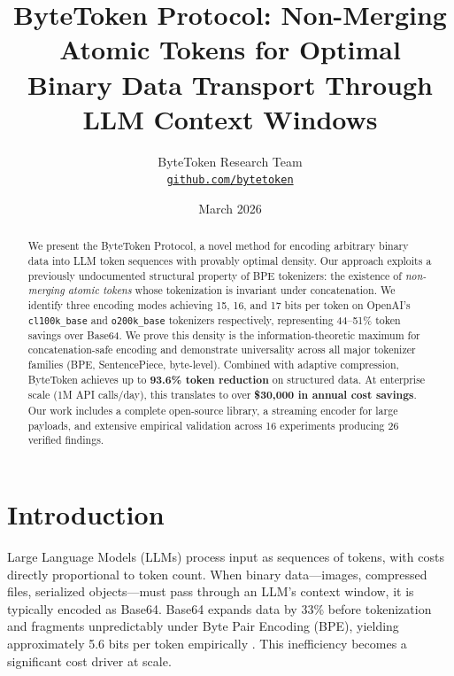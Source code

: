 \documentclass[10pt,twocolumn,letterpaper]{article}
\begin{document}
\title{ByteToken Protocol: Non-Merging Atomic Tokens for Optimal \\ Binary Data Transport Through LLM Context Windows}

\author{ByteToken Research Team\\
{\tt\small \href{https://github.com/bytetoken}{github.com/bytetoken}}
}

\date{March 2026}

\maketitle

\begin{abstract}
We present the ByteToken Protocol, a novel method for encoding arbitrary binary data into LLM token sequences with provably optimal density. Our approach exploits a previously undocumented structural property of BPE tokenizers: the existence of \textit{non-merging atomic tokens} whose tokenization is invariant under concatenation. We identify three encoding modes achieving 15, 16, and 17 bits per token on OpenAI's \texttt{cl100k\_base} and \texttt{o200k\_base} tokenizers respectively, representing 44--51\% token savings over Base64. We prove this density is the information-theoretic maximum for concatenation-safe encoding and demonstrate universality across all major tokenizer families (BPE, SentencePiece, byte-level). Combined with adaptive compression, ByteToken achieves up to \textbf{93.6\% token reduction} on structured data. At enterprise scale (1M API calls/day), this translates to over \textbf{\$30,000 in annual cost savings}. Our work includes a complete open-source library, a streaming encoder for large payloads, and extensive empirical validation across 16 experiments producing 26 verified findings.
\end{abstract}

\section{Introduction}

Large Language Models (LLMs) process input as sequences of tokens, with costs directly proportional to token count. When binary data---images, compressed files, serialized objects---must pass through an LLM's context window, it is typically encoded as Base64. Base64 expands data by 33\% before tokenization and fragments unpredictably under Byte Pair Encoding (BPE), yielding approximately 5.6 bits per token empirically \cite{openai_tiktoken}. This inefficiency becomes a significant cost driver at scale.
\end{document}

